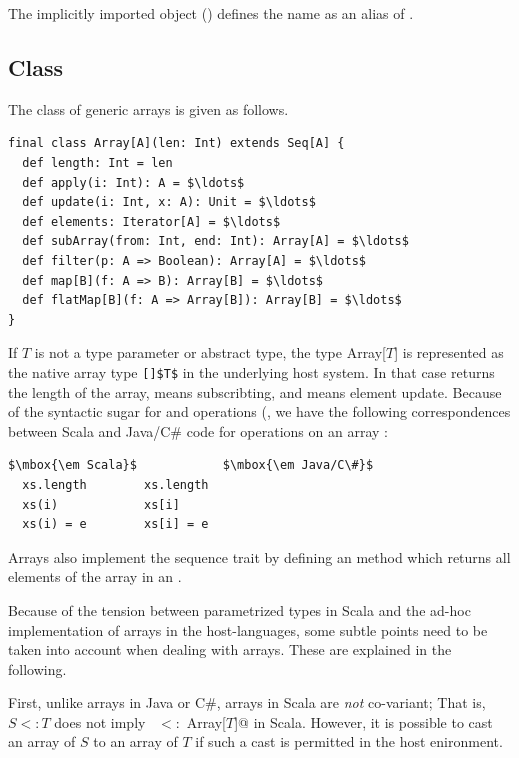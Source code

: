 {The implicitly imported  object () defines the name 
 as an alias of .

\subsection{Class \large{}}\label{cls:array}

The class of generic arrays is given as follows.

\begin{lstlisting}
final class Array[A](len: Int) extends Seq[A] {
  def length: Int = len
  def apply(i: Int): A = $\ldots$
  def update(i: Int, x: A): Unit = $\ldots$
  def elements: Iterator[A] = $\ldots$
  def subArray(from: Int, end: Int): Array[A] = $\ldots$
  def filter(p: A => Boolean): Array[A] = $\ldots$
  def map[B](f: A => B): Array[B] = $\ldots$
  def flatMap[B](f: A => Array[B]): Array[B] = $\ldots$
}
\end{lstlisting}
If $T$ is not a type parameter or abstract type, the type Array[$T$]
is represented as the native array type \lstinline{[]$T$} in the
underlying host system. In that case  returns
the length of the array,  means subscribting, and
 means element update. Because of the syntactic sugar for
 and
 operations (,
we have the following correspondences between Scala and Java/C\# code for
operations on an array :

\begin{lstlisting}
$\mbox{\em Scala}$            $\mbox{\em Java/C\#}$
  xs.length        xs.length
  xs(i)            xs[i]
  xs(i) = e        xs[i] = e
\end{lstlisting}

Arrays also implement the sequence trait 
by defining an  method which returns
all elements of the array in an .

Because of the tension between parametrized types in Scala and the ad-hoc
implementation of arrays in the host-languages, some subtle points
need to be taken into account when dealing with arrays. These are
explained in the following.

First, unlike arrays in Java or C\#, arrays in Scala are {\em not}
co-variant; That is, $S <: T$ does not imply 
~\lstinline@Array[$S$] $<:$ Array[$T$]@ in Scala.  
However, it is possible to cast an array
of $S$ to an array of $T$ if such a cast is permitted in the host
enironment.

}
